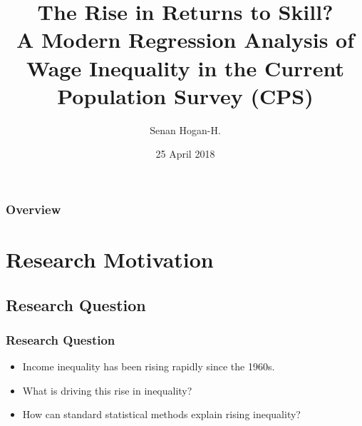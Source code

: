 \documentclass{beamer}
\title[The Rise in Returns to Skill?]{The Rise in Returns to Skill? \\ \large{A Modern Regression Analysis of Wage Inequality in the Current Population Survey (CPS)}} %
\author{Senan Hogan-H.} %
\institute[ECON 190: Senior Seminar in Economics] %
{
ECON 190, Pomona College\\ %
\medskip
\textit{senan.hoganhennessy@pomona.edu} %
}
\date{25 April 2018} %
\begin{document}
\begin{frame}
\titlepage %
\end{frame}

\begin{frame}
\frametitle{Overview} %
\tableofcontents %
\end{frame}


\section{Research Motivation} %

\subsection{Research Question} %

\begin{frame}
\frametitle{Research Question}
\begin{itemize} \pause
\item Income inequality has been rising rapidly since the 1960s. \pause
\item What is driving this rise in inequality? \pause
\item How can standard statistical methods explain rising inequality?
\end{itemize}
\end{frame}
\end{document}
